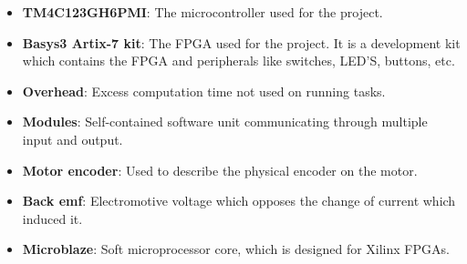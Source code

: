 \documentclass[../../main.tex]{subfiles}
\begin{document}
\begin{itemize}
    \item \textbf{TM4C123GH6PMI}: The microcontroller used for the project.
    \item \textbf{Basys3 Artix-7 kit}: The FPGA used for the project. It is a development kit which contains the FPGA and peripherals like switches, LED'S, buttons, etc.
    \item \textbf{Overhead}: Excess computation time not used on running tasks.
    \item \textbf{Modules}: Self-contained software unit communicating through multiple input and output.
    \item \textbf{Motor encoder}: Used to describe the physical encoder on the motor.
    \item \textbf{Back emf}: Electromotive voltage which opposes the change of current which induced it. 
    \item \textbf{Microblaze}: Soft microprocessor core, which is designed for Xilinx FPGAs.
    
    
    
    
    
    
    

\end{itemize}
\end{document}
